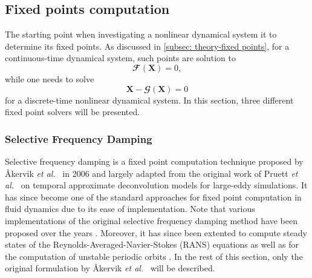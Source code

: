 




  \subsection{Fixed points computation}
  \label{subsec: numerics-fixed points computation}

  The starting point when investigating a nonlinear dynamical system it to determine its fixed points. As discussed in \textsection \ref{subsec: theory-fixed points}, for a continuous-time dynamical system, such points are solution to
  \begin{equation}
    \mathbfcal{F} \left( \mathbf{X} \right) = 0,
    \label{eq: numerics -- continuous-time fixed point}
  \end{equation}
  while one needs to solve
  \begin{equation}
    \mathbf{X} - \mathbfcal{G} \left( \mathbf{X} \right) = 0
    \label{eq: numerics -- discrete-time fixed point}
  \end{equation}
  for a discrete-time nonlinear dynamical system. In this section, three different fixed point solvers will be presented.

    \subsubsection{Selective Frequency Damping}

    Selective frequency damping is a fixed point computation technique proposed by {\AA}kervik \emph{et al.}\ \cite{pof:akervik:2006} in 2006 and largely adapted from the original work of Pruett \emph{et al.}\ \cite{pof:pruett:2003, pof:pruett:2006} on temporal approximate deconvolution models for large-eddy simulations. It has since become one of the standard approaches for fixed point computation in fluid dynamics due to its ease of implementation. Note that various implementations of the original selective frequency damping method have been proposed over the years \cite{pof:jordi:2014, pof:jordi:2015, pof:cunha:2015}. Moreover, it has since been extented to compute steady states of the Reynolds-Averaged-Navier-Stokes (RANS) equations \cite{cf:richez:2016} as well as for the computation of unstable periodic orbits \cite{prf:leopold:2017}. In the rest of this section, only the original formulation by {\AA}kervik \emph{et al.}\ \cite{pof:akervik:2006} will be described.


